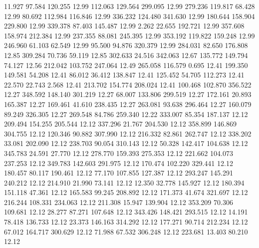   11.927   97.584  120.255        12.99
 112.063  129.564  299.095        12.99
 279.236  119.817   68.428        12.99
  80.692  112.984  116.846        12.99
 336.232  124.480  341.630        12.99
 180.644  158.904  229.800        12.99
 339.378   87.403  145.487        12.99
   2.262   22.655  192.721        12.99
 357.608  158.974  212.384        12.99
 237.355   88.081  245.395        12.99
 353.192  119.822  159.248        12.99
 246.960   61.103   62.549        12.99
  95.500   94.876  320.379        12.99
 284.031   82.650  176.808        12.85
 309.284   70.736   59.119        12.85
 302.633   24.516  342.063        12.67
 135.772  149.794   74.127        12.56
 212.042  103.752  247.064        12.49
 265.058  116.579    0.695        12.41
 199.350  149.581   54.208        12.41
  86.012   36.412  138.847        12.41
 125.452   54.705  112.273        12.41
  22.570   22.743    2.568        12.41
 213.702  154.774  208.024        12.41
 100.468  102.870  356.522        12.27
 348.592  148.140  301.219        12.27
  68.007  133.806  299.519        12.27
 172.161   20.893  165.387        12.27
 169.461   41.610  238.435        12.27
 263.081   93.638  296.464        12.27
 160.079   89.249  326.305        12.27
 269.548   84.786  259.340        12.22
 333.007   85.354  187.137        12.12
 209.494  154.255  205.544        12.12
 337.296   21.767  204.530        12.12
 358.899  146.869  304.755        12.12
 120.346   90.882  307.990        12.12
 216.332   82.861  262.747        12.12
 338.202   33.081  202.090        12.12
 238.703   90.054  310.143        12.12
  50.328  142.417  104.638        12.12
 345.783   24.591   27.770        12.12
 278.770  159.393  275.353        12.12
 221.662  104.073  237.253        12.12
 349.783  142.603  291.975        12.12
 170.474  102.220  329.441        12.12
 180.457   80.117  190.461        12.12
  77.170  107.855  127.387        12.12
 293.247  145.291  240.212        12.12
 214.910   21.990   73.141        12.12
  12.350   32.778  145.927        12.12
 180.394  151.118   47.361        12.12
 165.583   99.245  208.892        12.12
 171.373   41.674  321.697        12.12
 216.244  108.331  234.063        12.12
 211.308   15.947  139.904        12.12
 353.209   70.306  109.681        12.12
  28.277   87.271  107.648        12.12
 343.426  148.421  293.515        12.12
  14.191   78.418  136.733        12.12
  23.373  146.163  314.292        12.12
 177.271   90.714  212.234        12.12
  67.012  164.717  300.629        12.12
  71.988   67.532  306.248        12.12
 223.681   13.403   80.210        12.12
